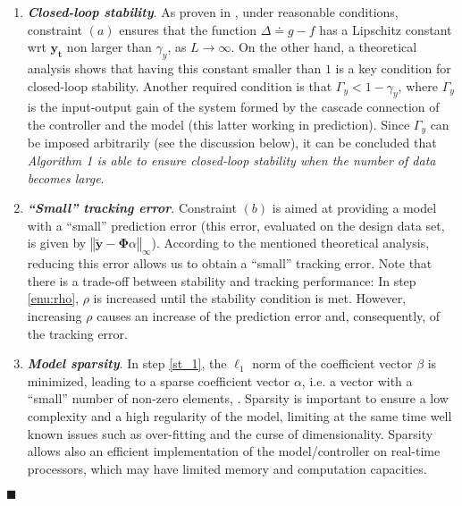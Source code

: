 \documentclass[twocolumn,english,journal]{IEEEtran}
\begin{document}
\begin{enumerate}
\item \textbf{\emph{Closed-loop stability}}. As proven in \cite{NoFaMiAUT13},
under reasonable conditions, constraint $(a)$ ensures that the function
$\Delta\doteq g-f$ has a Lipschitz constant wrt $\boldsymbol{y_{t}}$
non larger than $\gamma_{y}$, as $L\rightarrow\infty$. On the other
hand, a theoretical analysis shows that having this constant smaller
than $1$ is a key condition for closed-loop stability. Another required
condition is that $\Gamma_{y}<1-\gamma_{y}$, where $\Gamma_{y}$
is the input-output gain of the system formed by the cascade connection
of the controller and the model (this latter working in prediction).
Since $\Gamma_{y}$ can be imposed arbitrarily (see the discussion
below), it can be concluded that \emph{Algorithm 1 is able to ensure
closed-loop stability when the number of data becomes large}.\medskip{}

\item \textbf{\emph{``Small'' tracking error}}. Constraint $(b)$ is aimed
at providing a model with a ``small'' prediction error (this error,
evaluated on the design data set, is given by $\left\Vert \widetilde{\mathbf{y}}-\mathbf{\Phi}\alpha\right\Vert _{\infty}$).
According to the mentioned theoretical analysis, reducing this error
allows us to obtain a ``small'' tracking error. Note that there is
a trade-off between stability and tracking performance: In step \ref{enu:rho},
$\rho$ is increased until the stability condition is met. However,
increasing $\rho$ causes an increase of the prediction error and,
consequently, of the tracking error.\medskip{}

\item \textbf{\emph{Model sparsity}}. In step \ref{st_1}, the $\ell_{1}$
norm of the coefficient vector $\beta$ is minimized, leading to a
sparse coefficient vector $\alpha$, i.e. a vector with a ``small\textquotedblright{}
number of non-zero elements, \cite{Fuchs05,Donoho06_2,Candes06_1,Tropp06}.
Sparsity is important to ensure a low complexity and a high regularity
of the model, limiting at the same time well known issues such as
over-fitting and the curse of dimensionality. Sparsity allows also
an efficient implementation of the model/controller on real-time processors,
which may have limited memory and computation capacities.
\end{enumerate}
\hfill{}$\blacksquare$\medskip{}
\end{document}
